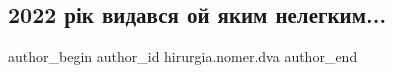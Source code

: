  
 
 
 
 

\subsection{2022 рік видався ой яким нелегким...}
\label{sec:27_12_2022.fb.hirurgia.nomer.dva.1.2022_r_k_vidavsya_oi}

\ifcmt
 author_begin
   author_id hirurgia.nomer.dva
 author_end
\fi
